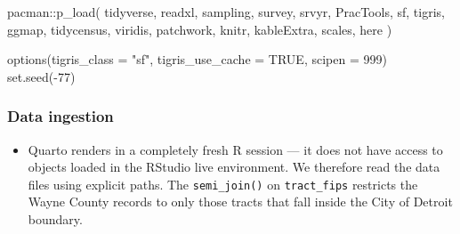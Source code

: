 \documentclass[
  11pt,
]{article}
\newenvironment{Shaded}{\begin{snugshade}}{\end{snugshade}}
\newcommand{\AttributeTok}[1]{\textcolor[rgb]{0.40,0.45,0.13}{#1}}
\newcommand{\ConstantTok}[1]{\textcolor[rgb]{0.56,0.35,0.01}{#1}}
\newcommand{\DecValTok}[1]{\textcolor[rgb]{0.68,0.00,0.00}{#1}}
\newcommand{\FunctionTok}[1]{\textcolor[rgb]{0.28,0.35,0.67}{#1}}
\newcommand{\NormalTok}[1]{\textcolor[rgb]{0.00,0.23,0.31}{#1}}
\newcommand{\SpecialCharTok}[1]{\textcolor[rgb]{0.37,0.37,0.37}{#1}}
\newcommand{\StringTok}[1]{\textcolor[rgb]{0.13,0.47,0.30}{#1}}
\providecommand{\tightlist}{%
  \setlength{\itemsep}{0pt}\setlength{\parskip}{0pt}}\usepackage{longtable,booktabs,array}
\begin{document}
\begin{Shaded}
\begin{Highlighting}[]
\NormalTok{pacman}\SpecialCharTok{::}\FunctionTok{p\_load}\NormalTok{(}
\NormalTok{  tidyverse, readxl,}
\NormalTok{  sampling,}
\NormalTok{  survey, srvyr,}
\NormalTok{  PracTools,}
\NormalTok{  sf, tigris, ggmap,}
\NormalTok{  tidycensus,}
\NormalTok{  viridis, patchwork,}
\NormalTok{  knitr, kableExtra, scales, here}
\NormalTok{)}

\FunctionTok{options}\NormalTok{(}\AttributeTok{tigris\_class =} \StringTok{"sf"}\NormalTok{, }\AttributeTok{tigris\_use\_cache =} \ConstantTok{TRUE}\NormalTok{, }\AttributeTok{scipen =} \DecValTok{999}\NormalTok{)}
\FunctionTok{set.seed}\NormalTok{(}\SpecialCharTok{{-}}\DecValTok{77}\NormalTok{)}
\end{Highlighting}
\end{Shaded}

\subsubsection{Data ingestion}\label{data-ingestion}

\begin{itemize}
\tightlist
\item
  Quarto renders in a completely fresh R session --- it does not have
  access to objects loaded in the RStudio live environment. We therefore
  read the data files using explicit paths. The \texttt{semi\_join()} on
  \texttt{tract\_fips} restricts the Wayne County records to only those
  tracts that fall inside the City of Detroit boundary.
\end{itemize}
\end{document}
